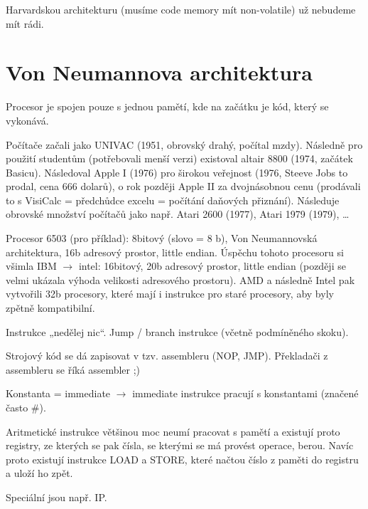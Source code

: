 \documentclass[12pt]{article}					%
\begin{document}
        \begin{poznamka}
                Harvardskou architekturu (musíme code memory mít non-volatile) už nebudeme mít rádi. 
        \end{poznamka}

    \section{Von Neumannova architektura}
        \begin{definice}
            Procesor je spojen pouze s jednou pamětí, kde na začátku je kód, který se vykonává.
        \end{definice}
        
        \begin{poznamka}[Historie]
            Počítače začali jako UNIVAC (1951, obrovský drahý, počítal mzdy). Následně pro použití studentům (potřebovali menší verzi) existoval altair 8800 (1974, začátek Basicu). Následoval Apple I (1976) pro širokou veřejnost (1976, Steeve Jobs to prodal, cena 666 dolarů), o rok později Apple II za dvojnásobnou cenu (prodávali to s VisiCalc = předchůdce excelu = počítání daňových přiznání). Následuje obrovské množství počítačů jako např. Atari 2600 (1977), Atari 1979 (1979), …

            Procesor 6503 (pro příklad): 8bitový (slovo = 8 b), Von Neumannovská architektura, 16b adresový prostor, little endian. Úspěchu tohoto procesoru si všimla IBM $\rightarrow$ intel: 16bitový, 20b adresový prostor, little endian (později se velmi ukázala výhoda velikosti adresového prostoru). AMD a následně Intel pak vytvořili 32b procesory, které mají i instrukce pro staré procesory, aby byly zpětně kompatibilní.
        \end{poznamka}

        \begin{definice}
            Instrukce „nedělej nic“. Jump / branch instrukce (včetně podmíněného skoku). 

            Strojový kód se dá zapisovat v tzv. assembleru (NOP, JMP). Překladači z assembleru se říká assembler ;)

            Konstanta = immediate $\rightarrow$ immediate instrukce pracují s konstantami (značené často \#).
        \end{definice}

        \begin{definice}
            Aritmetické instrukce většinou moc neumí pracovat s pamětí a existují proto registry, ze kterých se pak čísla, se kterými se má provést operace, berou. Navíc proto existují instrukce LOAD a STORE, které načtou číslo z paměti do registru a uloží ho zpět.

            Speciální jsou např. IP.
        \end{definice}
\end{document}

